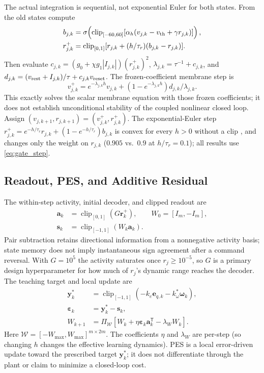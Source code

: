 \documentclass[letterpaper, 10 pt, conference]{ieeeconf}
\newcommand{\T}{^{\mathsf T}}
\newcommand{\clip}{\operatorname{clip}}
\begin{document}
The actual integration is sequential, not exponential Euler for both
states. From the old states compute
\begin{align}
 b_{j,k}&=\sigma\!\left(\clip_{[-60,60]}
       [\alpha_h(v_{j,k}-v_{\rm th}+\gamma r_{j,k})]\right),\\
 r_{j,k}^{+}&=\clip_{[0,1]}
       [r_{j,k}+(h/\tau_r)(b_{j,k}-r_{j,k})].
 \label{eq:gate_step}
\end{align}
Then evaluate $c_{j,k}=(g_0+\chi g_1|I_{j,k}|)(r_{j,k}^{+})^2$,
$\lambda_{j,k}=\tau^{-1}+c_{j,k}$, and
$d_{j,k}=(v_{\rm rest}+I_{j,k})/\tau+c_{j,k}v_{\rm reset}$. The
frozen-coefficient membrane step is
\begin{equation}
 v_{j,k}^{+}=e^{-\lambda_{j,k}h}v_{j,k}
       +(1-e^{-\lambda_{j,k}h})d_{j,k}/\lambda_{j,k}.
 \label{eq:mem_step}
\end{equation}
This exactly solves the scalar membrane equation with those frozen
coefficients; it does not establish unconditional stability of the coupled
nonlinear closed loop. Assign $(v_{j,k+1},r_{j,k+1})=(v_{j,k}^{+},r_{j,k}^{+})$.
The exponential-Euler step $r_{j,k}^{+}=e^{-h/\tau_r}r_{j,k}+(1-e^{-h/\tau_r})b_{j,k}$ is
convex for every $h>0$ without a clip \cite{hochbruck2010exponential}, and changes only the
weight on $r_{j,k}$ ($0.905$ vs.\ $0.9$ at $h/\tau_r=0.1$); all results use \eqref{eq:gate_step}.

\subsection{Readout, PES, and Additive Residual}
The within-step activity, initial decoder, and clipped readout are
\begin{equation}
 \begin{aligned}
 \bm a_k&=\clip_{[0,1]}(G\bm r_k^+),\qquad W_0=[I_m,-I_m],\\
 \bm s_k&=\clip_{[-1,1]}(W_k\bm a_k).
 \end{aligned}
 \label{eq:readout}
\end{equation}
Pair subtraction retains directional information from a nonnegative
activity basis; state memory does not imply instantaneous sign agreement
after a command reversal. With $G=10^5$ the activity saturates once
$r_j\ge10^{-5}$, so $G$ is a primary design hyperparameter for how much of
$r_j$'s dynamic range reaches the decoder. The teaching target and local update are
\begin{align}
 \bm y_k^*&=\clip_{[-1,1]}(-k_e\bm e_{q,k}-k_\omega^*\bm\omega_k),\\
 \bm\varepsilon_k&=\bm y_k^*-\bm s_k,\\
 W_{k+1}&=\Pi_{\mathcal W}
       [W_k+\eta\bm\varepsilon_k\bm a_k\T-\lambda_W W_k].
 \label{eq:pes}
\end{align}
Here $\mathcal W=[-W_{\max},W_{\max}]^{m\times2m}$. The coefficients $\eta$ and $\lambda_W$ are per-step (so changing $h$ changes the effective learning dynamics). PES is a local error-driven update toward the prescribed target $\bm y_k^*$; it does not differentiate through the plant or claim to minimize a closed-loop cost.
\end{document}
